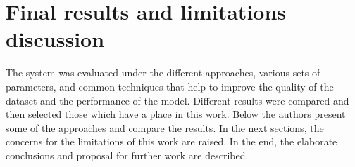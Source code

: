 \chapter{Final results and limitations discussion}\label{ch:final-results-and-summary-discussion}
The system was evaluated under the different approaches, various sets of parameters, and common techniques that help to improve the quality of the dataset and the performance of the model.
Different results were compared and then selected those which have a place in this work.
Below the authors present some of the approaches and compare the results.
In the next sections, the concerns for the limitations of this work are raised.
In the end, the elaborate conclusions and proposal for further work are described.